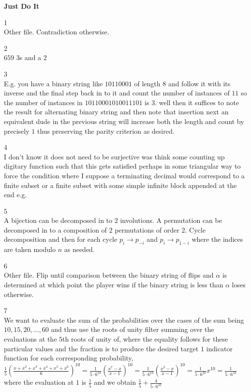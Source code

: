 \textbf{Just Do It}

1 \\
Other file. Contradiction otherwise.

2 \\
$659$ $3$s and a $2$

3 \\
E.g. you have a binary string like $10110001$ of length $8$ and follow it with its inverse and the final step back in to it and count the number of instances of $11$ so the number of instances in $10110001010011101$ is $3$. well then it suffices to note the result for alternating binary string and then note that insertion next an equivalent dude in the previous string will increase both the length and count by precisely $1$ thus preserving the parity criterion as desired.

4 \\
I don't know it does not need to be surjective was think some counting up digitary function such that this gets satisfied perhaps in some triangular way to force the condition where I suppose a terminating decimal would correspond to a finite subset or a finite subset with some simple infinite block appended at the end e.g.

5 \\
A bijection can be decomposed in to $2$ involutions. A permutation can be decomposed in to a composition of $2$ permutations of order $2$. Cycle decomposition and then for each cycle $p_i \to p_{-i}$ and $p_i \to p_{1-i}$ where the indices are taken modulo $n$ as needed.

6 \\
Other file. Flip until comparison between the binary string of flips and $\alpha$ is determined at which point the player wins if the binary string is less than $\alpha$ loses otherwise.

7 \\
We want to evaluate the sum of the probabilities over the cases of the sum being $10,15,20,\dots,60$ and thus use the roots of unity filter summing over the evaluations at the $5$th roots of unity of, where the equality follows for these particular values and the fraction is to produce the desired target $1$ indicator function for each corresponding probability, $\frac{1}{5}\left(\frac{x+x^2+x^3+x^4+x^5+x^6}{6}\right)^{10}=\frac{1}{5\cdot 6^{10}}\left(\frac{x^7-x}{x-1}\right)^{10}=\frac{1}{5\cdot 6^{10}}\left(\frac{x^2-x}{x-1}\right)^{10}=\frac{1}{5\cdot 6^{10}}x^{10}=\frac{1}{5\cdot 6^{10}}$ where the evaluation at $1$ is $\frac{1}{5}$ and we obtain $\boxed{\frac{1}{5}+\frac{4}{5\cdot 6^{10}}}$

